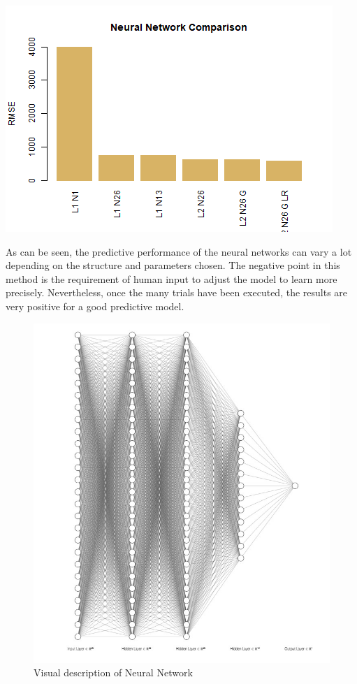 \documentclass[
  paper=a4,
  ,captions=tableheading
]{scrartcl}
\begin{document}
\begin{center}\includegraphics{Diamonds_PDF_files/figure-latex/NN Summary-1} \end{center}

As can be seen, the predictive performance of the neural networks can
vary a lot depending on the structure and parameters chosen. The
negative point in this method is the requirement of human input to
adjust the model to learn more precisely. Nevertheless, once the many
trials have been executed, the results are very positive for a good
predictive model.

\begin{figure}
\centering
\includegraphics{NN_rep.jpeg}
\caption{Visual description of Neural Network}
\end{figure}
\end{document}
